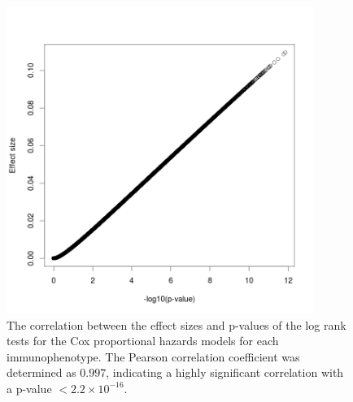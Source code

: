 \begin{figure}[!ht]
  \begin{center}
    \includegraphics[width=10cm]{figs/rchy/figs/cor}
  \end{center}
  \caption{The correlation between the effect sizes and p-values of the log rank tests for the Cox proportional hazards models for each immunophenotype. The Pearson correlation coefficient was determined as $0.997$, indicating a highly significant correlation with a p-value  $< 2.2 \times 10^{-16}$.}
  \label{r1:effectsizevspv}
\end{figure}






